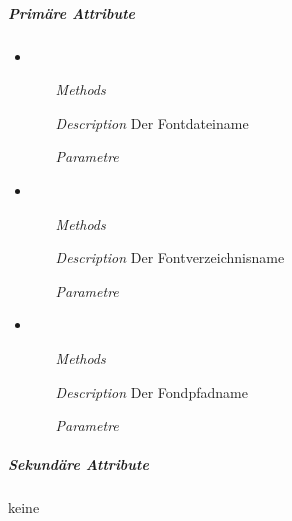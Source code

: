 
\newpage

\subparagraph{Prim\"are Attribute}
\begin{itemize}
\item {}
\begin{enumerate}
\item[\textit{Methods}] 
\item[\textit{Description}] Der Fontdateiname
\item[\textit{Parametre}] 
\end{enumerate}

\item {}
\begin{enumerate}
\item[\textit{Methods}] 
\item[\textit{Description}] Der Fontverzeichnisname
\item[\textit{Parametre}] 
\end{enumerate}

\item {}
\begin{enumerate}
\item[\textit{Methods}] 
\item[\textit{Description}] Der Fondpfadname
\item[\textit{Parametre}] 
\end{enumerate}

\end{itemize}


\newpage

\subparagraph{Sekund\"are Attribute}
keine


\newpage

